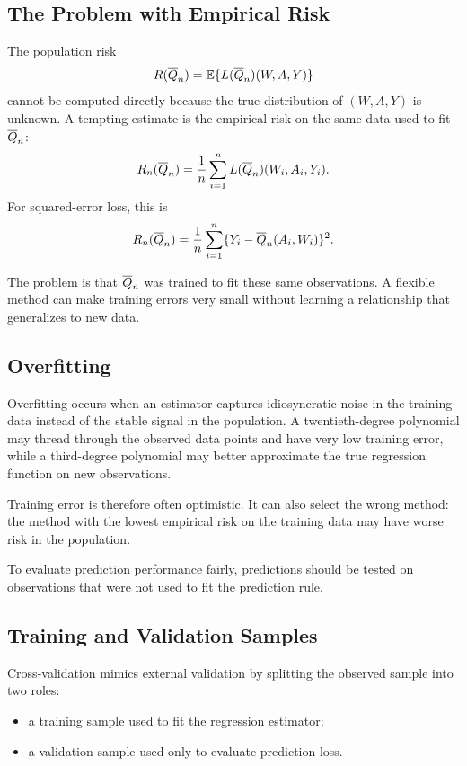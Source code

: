 \label{lec:5-4}

\subsection{The Problem with Empirical Risk}

The population risk
\[
R(\overline{Q}_n)=\mathbb{E}\{L(\overline{Q}_n)(W,A,Y)\}
\]
cannot be computed directly because the true distribution of $(W,A,Y)$ is unknown.
A tempting estimate is the empirical risk on the same data used to fit $\overline{Q}_n$:
\[
R_n(\overline{Q}_n)
=
\frac{1}{n}\sum_{i=1}^n
L(\overline{Q}_n)(W_i,A_i,Y_i).
\]
For squared-error loss, this is
\[
R_n(\overline{Q}_n)
=
\frac{1}{n}\sum_{i=1}^n
\{Y_i-\overline{Q}_n(A_i,W_i)\}^2.
\]

The problem is that $\overline{Q}_n$ was trained to fit these same observations. A flexible
method can make training errors very small without learning a relationship that
generalizes to new data.

\subsection{Overfitting}

Overfitting occurs when an estimator captures idiosyncratic noise in the training data
instead of the stable signal in the population. A twentieth-degree polynomial may
thread through the observed data points and have very low training error, while a
third-degree polynomial may better approximate the true regression function on new
observations.

Training error is therefore often optimistic. It can also select the wrong method:
the method with the lowest empirical risk on the training data may have worse risk in
the population.

\begin{keyidea}
To evaluate prediction performance fairly, predictions should be tested on
observations that were not used to fit the prediction rule.
\end{keyidea}

\subsection{Training and Validation Samples}

Cross-validation mimics external validation by splitting the observed sample into two
roles:
\begin{itemize}
\item a training sample used to fit the regression estimator;
\item a validation sample used only to evaluate prediction loss.
\end{itemize}

